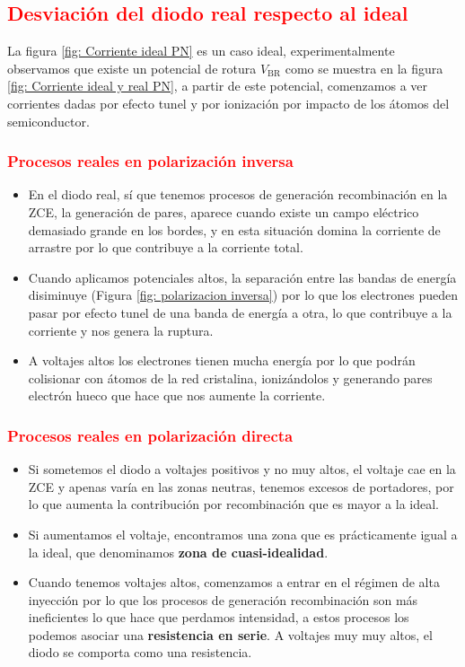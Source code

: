 \subsection{\textcolor{red}{Desviación del diodo real respecto al ideal}}
\noindent La figura \ref{fig: Corriente ideal PN} es un caso ideal, experimentalmente observamos que existe un potencial de rotura $V_\mathrm{BR}$ como se muestra en la figura \ref{fig: Corriente ideal y real PN}, a partir de este potencial, comenzamos a ver corrientes dadas por efecto tunel y por ionización por impacto de los átomos del semiconductor.
\clearpage

\subsubsection{\textcolor{red}{Procesos reales en polarización inversa}}
\begin{itemize}
    \item En el diodo real, sí que tenemos procesos de generación recombinación en la ZCE, la generación de pares, aparece cuando existe un campo eléctrico demasiado grande en los bordes, y en esta situación domina la corriente de arrastre por lo que contribuye a la corriente total.
    \item Cuando aplicamos potenciales altos, la separación entre las bandas de energía disiminuye (Figura \ref{fig: polarizacion inversa}) por lo que los electrones pueden pasar por efecto tunel de una banda de energía a otra, lo que contribuye a la corriente y nos genera la ruptura.
    \item A voltajes altos los electrones tienen mucha energía por lo que podrán colisionar con átomos de la red cristalina, ionizándolos y generando pares electrón hueco que hace que nos aumente la corriente.
\end{itemize}
\subsubsection{\textcolor{red}{Procesos reales en polarización directa}}
\begin{itemize}
    \item Si sometemos el diodo a voltajes positivos y no muy altos, el voltaje cae en la ZCE y apenas varía en las zonas neutras, tenemos excesos de portadores, por lo que aumenta la contribución por recombinación que es mayor a la ideal.
    \item Si aumentamos el voltaje, encontramos una zona que es prácticamente igual a la ideal, que denominamos \textbf{zona de cuasi-idealidad}.
    \item Cuando tenemos voltajes altos, comenzamos a entrar en el régimen de alta inyección por lo que los procesos de generación recombinación son más ineficientes lo que hace que perdamos intensidad, a estos procesos los podemos asociar una \textbf{resistencia en serie}. A voltajes muy muy altos, el diodo se comporta como una resistencia.
\end{itemize}

